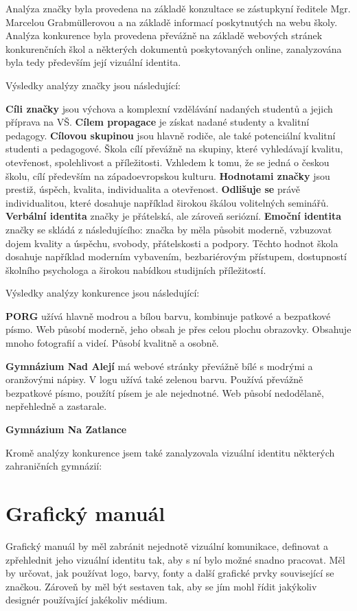 \documentclass[11pt,a4paper,twoside,openright]{report}
\begin{document}
Analýza značky byla provedena na základě konzultace se zástupkyní ředitele Mgr. Marcelou Grabmüllerovou a na základě informací poskytnutých na webu školy. Analýza konkurence byla provedena převážně na základě webových stránek konkurenčních škol a některých dokumentů poskytovaných online, zanalyzována byla tedy především její vizuální identita.

Výsledky analýzy značky jsou následující:

\textbf{Cíli značky}  jsou výchova a komplexní vzdělávání nadaných studentů a jejich příprava na VŠ.
\textbf{Cílem propagace} je získat nadané studenty a kvalitní pedagogy.
\textbf{Cílovou skupinou} jsou hlavně rodiče, ale také potenciální kvalitní studenti a pedagogové. Škola cílí převážně na skupiny, které vyhledávají kvalitu, otevřenost, spolehlivost a příležitosti. Vzhledem k tomu, že se jedná o českou školu, cílí především na západoevropskou kulturu.
\textbf{Hodnotami značky} jsou prestiž, úspěch, kvalita, individualita a otevřenost. \textbf{Odlišuje se} právě individualitou, které dosahuje například širokou škálou volitelných seminářů.
\textbf{Verbální identita} značky je přátelská, ale zároveň seriózní.
\textbf{Emoční identita} značky se skládá z následujícího: značka by měla působit moderně, vzbuzovat dojem kvality a úspěchu, svobody, přátelskosti a podpory. Těchto hodnot škola dosahuje například moderním vybavením, bezbariérovým přístupem, dostupností školního psychologa a širokou nabídkou studijních příležitostí.\cite{svp}

Výsledky analýzy konkurence jsou následující:

\textbf{PORG} užívá hlavně modrou a bílou barvu, kombinuje patkové a bezpatkové písmo. Web působí moderně, jeho obsah je přes celou plochu obrazovky. Obsahuje mnoho fotografií a videí. Působí kvalitně a osobně.\cite{porg}

\textbf{Gymnázium Nad Alejí} má webové stránky převážně bílé s modrými a oranžovými nápisy. V logu užívá také zelenou barvu. Používá převážně bezpatkové písmo, použítí písem je ale nejednotné. Web působí nedodělaně, nepřehledně a zastarale.\cite{alej}\cite{einstein}

\textbf{Gymnázium Na Zatlance}

Kromě analýzy konkurence jsem také zanalyzovala vizuální identitu některých zahraničních gymnázií:

\section{Grafický manuál}
Grafický manuál by měl zabránit nejednotě vizuální komunikace, definovat a zpřehlednit jeho vizuální identitu tak, aby s ní bylo možné snadno pracovat. Měl by určovat, jak používat logo, barvy, fonty a další grafické prvky související se značkou. Zároveň by měl být sestaven tak, aby se jím mohl řídit jakýkoliv designér používající jakékoliv médium.
\end{document}
